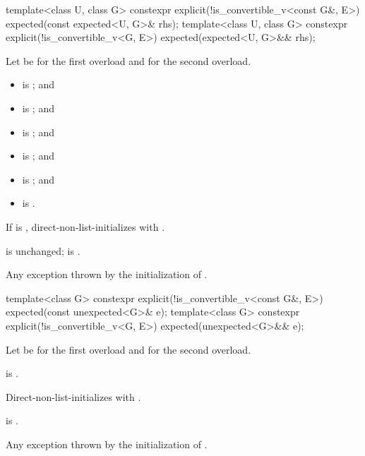 %
\begin{itemdecl}
template<class U, class G>
  constexpr explicit(!is_convertible_v<const G&, E>) expected(const expected<U, G>& rhs);
template<class U, class G>
  constexpr explicit(!is_convertible_v<G, E>) expected(expected<U, G>&& rhs);
\end{itemdecl}

\begin{itemdescr}
\pnum
Let  be  for the first overload and
 for the second overload.

\pnum
\constraints
\begin{itemize}
\item
{} is ; and
\item
{} is ; and
\item
{}
is ; and
\item
{}
is ; and
\item
{}
is ; and
\item
{}
is .
\end{itemize}

\pnum
\effects
If  is ,
direct-non-list-initializes 
with .

\pnum
\ensures
{} is unchanged;
 is .

\pnum
\throws
Any exception thrown by the initialization of .
\end{itemdescr}

%
\begin{itemdecl}
template<class G>
  constexpr explicit(!is_convertible_v<const G&, E>) expected(const unexpected<G>& e);
template<class G>
  constexpr explicit(!is_convertible_v<G, E>) expected(unexpected<G>&& e);
\end{itemdecl}

\begin{itemdescr}
\pnum
Let  be  for the first overload and
 for the second overload.

\pnum
\constraints
{} is .

\pnum
\effects
Direct-non-list-initializes 
with .

\pnum
\ensures
{} is .

\pnum
\throws
Any exception thrown by the initialization of .
\end{itemdescr}

